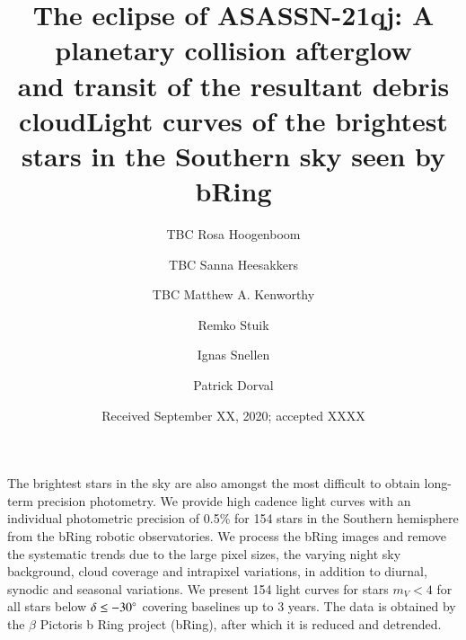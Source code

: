 \documentclass{aa}
\begin{document}
 
   \title{The eclipse of ASASSN-21qj: A planetary collision afterglow\\ and transit of the resultant debris cloud}

   \title{Light curves of the brightest stars in the Southern sky seen by bRing}

   \author{TBC Rosa Hoogenboom
          \and
          TBC Sanna Heesakkers
          \and
          TBC Matthew A. Kenworthy
          \and
          Remko Stuik
          \and
          Ignas Snellen
          \and
          Patrick Dorval
          }


   \date{Received September XX, 2020; accepted XXXX}

 
  \abstract
   {The brightest stars in the sky are also amongst the most difficult to obtain long-term precision photometry. }
   {We provide high cadence light curves with an individual photometric precision of 0.5\% for 154 stars in the Southern hemisphere from the bRing robotic observatories.}
   {We process the bRing images and remove the systematic trends due to the large pixel sizes, the varying night sky background, cloud coverage and intrapixel variations, in addition to diurnal, synodic and seasonal variations.}
   {We present 154 light curves for stars $m_V<4$ for all stars below $\delta \leq -30^\circ $ covering baselines up to 3 years. The data is obtained by the $\beta$ Pictoris b Ring project (bRing), after which it is reduced and detrended.}
   {}


   \maketitle
%
\end{document}
